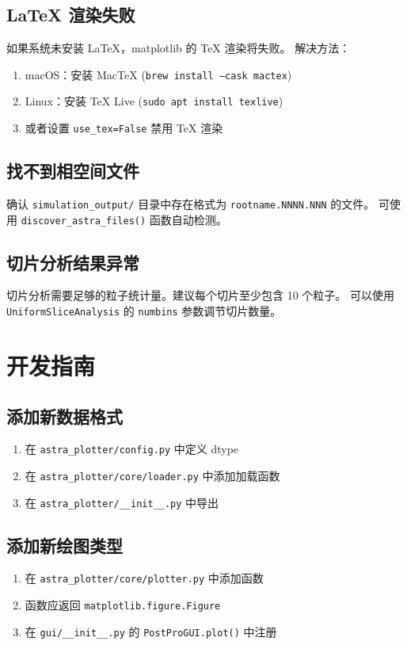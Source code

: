 \documentclass[11pt,a4paper]{article}
\begin{document}
\subsection{LaTeX 渲染失败}
如果系统未安装 LaTeX，matplotlib 的 TeX 渲染将失败。
解决方法：
\begin{enumerate}
    \item macOS：安装 MacTeX (\texttt{brew install --cask mactex})
    \item Linux：安装 TeX Live (\texttt{sudo apt install texlive})
    \item 或者设置 \texttt{use\_tex=False} 禁用 TeX 渲染
\end{enumerate}

\subsection{找不到相空间文件}
确认 \texttt{simulation\_output/} 目录中存在格式为
\texttt{rootname.NNNN.NNN} 的文件。
可使用 \texttt{discover\_astra\_files()} 函数自动检测。

\subsection{切片分析结果异常}
切片分析需要足够的粒子统计量。建议每个切片至少包含 10 个粒子。
可以使用 \texttt{UniformSliceAnalysis} 的 \texttt{numbins} 参数调节切片数量。

\section{开发指南}

\subsection{添加新数据格式}
\begin{enumerate}
    \item 在 \texttt{astra\_plotter/config.py} 中定义 dtype
    \item 在 \texttt{astra\_plotter/core/loader.py} 中添加加载函数
    \item 在 \texttt{astra\_plotter/\_\_init\_\_.py} 中导出
\end{enumerate}

\subsection{添加新绘图类型}
\begin{enumerate}
    \item 在 \texttt{astra\_plotter/core/plotter.py} 中添加函数
    \item 函数应返回 \texttt{matplotlib.figure.Figure}
    \item 在 \texttt{gui/\_\_init\_\_.py} 的 \texttt{PostProGUI.plot()} 中注册
\end{enumerate}
\end{document}

